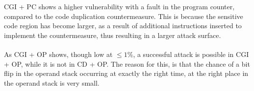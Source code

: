 CGI + PC shows a higher vulnerability with a fault in the program counter, compared to the code duplication countermeasure. This is because the sensitive code region has become larger, as a result of additional instructions inserted to implement the countermeasure, thus resulting in a larger attack surface.\\\\
As CGI + OP shows, though low at $\leq 1\%$, a successful attack is possible in CGI + OP, while it is not in CD + OP. The reason for this, is that the chance of a bit flip in the operand stack occurring at exactly the right time, at the right place in the operand stack is very small.